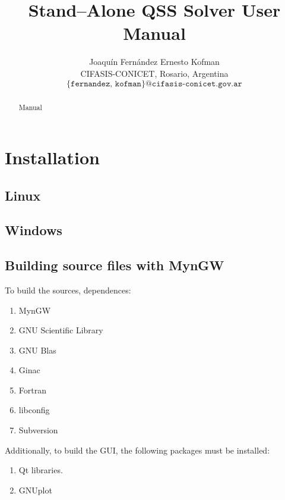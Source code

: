 \documentclass[11pt,a4paper]{article}
\begin{document}
\thispagestyle{empty}

\title{\textbf{Stand--Alone QSS Solver User Manual}}

\author{ Joaquín Fernández \quad Ernesto Kofman\quad \\
       CIFASIS-CONICET, Rosario, Argentina \\
       $\texttt{\{fernandez, kofman\}@cifasis-conicet.gov.ar}$
}

\date{} %
\maketitle\thispagestyle{empty} %

\begin{abstract}
Manual
\end{abstract}

\newpage

\section{Installation}

\subsection{Linux}

\subsection{Windows}
\subsection{Building source files with MynGW} 

To build the sources, dependences:

\begin{enumerate}
\item MynGW
\item GNU Scientific Library
\item GNU Blas
\item Ginac
\item Fortran
\item libconfig
\item Subversion
\end{enumerate}

Additionally, to build the GUI, the following packages must be installed:

\begin{enumerate}
\item Qt libraries.
\item GNUplot
\end{enumerate}
\end{document}
